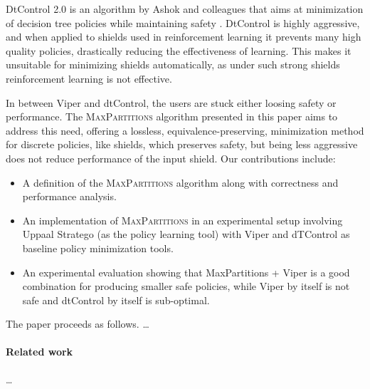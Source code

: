 DtControl 2.0 is an algorithm by Ashok and colleagues that aims at minimization of decision tree policies while maintaining safety \cite{dtControl,dtControl2}.  DtControl is highly aggressive, and when applied to shields used in reinforcement learning it prevents many high quality policies, drastically reducing the effectiveness of learning.  This makes it unsuitable for minimizing shields automatically, as under such strong shields reinforcement learning is not effective.

In between Viper and dtControl, the users are stuck either loosing safety or performance. The \textsc {MaxPartitions} algorithm presented in this paper aims to address this need, offering a lossless, equivalence-preserving, minimization method for discrete policies, like shields, which preserves safety, but being less aggressive does not reduce performance of the input shield. Our contributions include:
%
\begin {itemize}

\item A definition of the \textsc {MaxPartitions} algorithm along with correctness and performance analysis.

\item An implementation of \textsc {MaxPartitions} in an experimental setup involving Uppaal Stratego (as the policy learning tool) with Viper and dTControl as baseline policy minimization tools.

\item An experimental evaluation showing that MaxPartitions + Viper is a good combination for producing smaller safe policies, while Viper by itself is not safe and dtControl by itself is sub-optimal.

\end {itemize}

\noindent
The paper proceeds as follows. \ldots \textcolor {orange} {\lipsum [4]}

\paragraph{Related work} \ldots \textcolor {orange} {\lipsum[3]}
